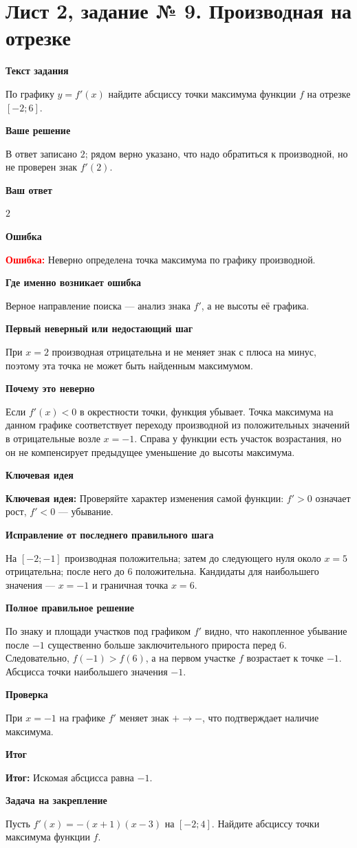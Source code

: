 \documentclass[11pt,a4paper]{article}
\newcommand{\Idea}{\textcolor{blue!60!black}{\textbf{Ключевая идея:}}}
\newcommand{\Res}{\textcolor{teal!60!black}{\textbf{Итог:}}}
\newcommand{\Heading}[2]{\par\medskip\textbf{#1}\par#2\par}
\begin{document}
\section*{Лист 2, задание № 9. Производная на отрезке}
\Heading{Текст задания}{По графику $y=f\prime(x)$ найдите абсциссу точки максимума функции $f$ на отрезке $[-2;6]$.}
\Heading{Ваше решение}{В ответ записано $2$; рядом верно указано, что надо обратиться к производной, но не проверен знак $f\prime(2)$.}
\Heading{Ваш ответ}{$2$}
\Heading{Ошибка}{\textcolor{red}{\textbf{Ошибка:}} Неверно определена точка максимума по графику производной.}
\Heading{Где именно возникает ошибка}{Верное направление поиска --- анализ знака $f\prime$, а не высоты её графика.}
\Heading{Первый неверный или недостающий шаг}{При $x=2$ производная отрицательна и не меняет знак с плюса на минус, поэтому эта точка не может быть найденным максимумом.}
\Heading{Почему это неверно}{Если $f\prime(x)<0$ в окрестности точки, функция убывает. Точка максимума на данном графике соответствует переходу производной из положительных значений в отрицательные возле $x=-1$. Справа у функции есть участок возрастания, но он не компенсирует предыдущее уменьшение до высоты максимума.}
\Heading{Ключевая идея}{\Idea{} Проверяйте характер изменения самой функции: $f\prime>0$ означает рост, $f\prime<0$ --- убывание.}
\Heading{Исправление от последнего правильного шага}{На $[-2;-1]$ производная положительна; затем до следующего нуля около $x=5$ отрицательна; после него до $6$ положительна. Кандидаты для наибольшего значения --- $x=-1$ и граничная точка $x=6$.}
\Heading{Полное правильное решение}{По знаку и площади участков под графиком $f\prime$ видно, что накопленное убывание после $-1$ существенно больше заключительного прироста перед $6$. Следовательно, $f(-1)>f(6)$, а на первом участке $f$ возрастает к точке $-1$. Абсцисса точки наибольшего значения $-1$.}
\Heading{Проверка}{При $x=-1$ на графике $f\prime$ меняет знак $+\to-$, что подтверждает наличие максимума.}
\Heading{Итог}{\Res{} Искомая абсцисса равна $-1$.}
\Heading{Задача на закрепление}{Пусть $f\prime(x)=-(x+1)(x-3)$ на $[-2;4]$. Найдите абсциссу точки максимума функции $f$.}
\newpage
{}\label{task:2_12}
\end{document}
